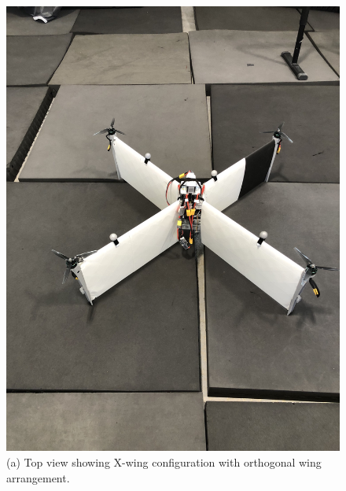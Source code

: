 \begin{figure}[htbp]
\centering
\begin{minipage}[b]{0.48\textwidth}
    \centering
    \includegraphics[width=\textwidth,angle=-90]{figures/drone_hover.jpg}
    \caption*{(a) Top view showing X-wing configuration with orthogonal wing arrangement.}
\end{minipage}
\hfill
\begin{minipage}[b]{0.48\textwidth}
    \centering

\end{minipage}
\end{figure}
